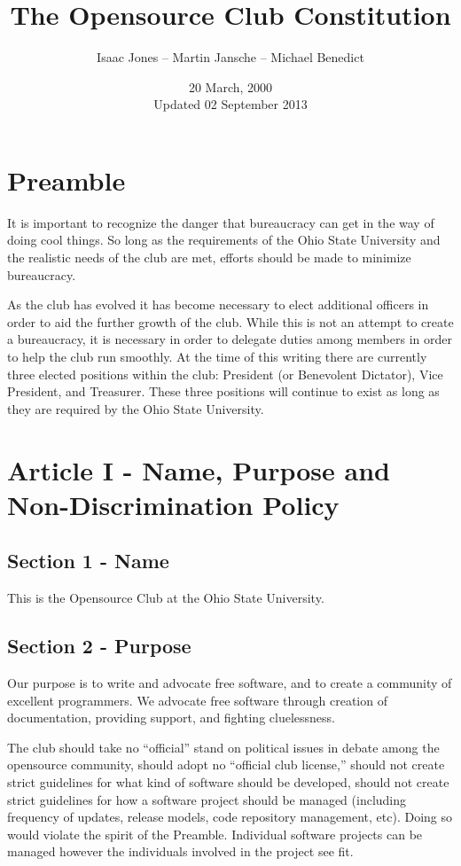 \documentclass{article}
\title{The Opensource Club Constitution}
\author{Isaac Jones -- Martin Jansche -- Michael Benedict}
\date{20 March, 2000\\ Updated 02 September 2013}
\begin{document}
	\maketitle

	\section{Preamble}

	It is important to recognize the danger that bureaucracy can get in the way of doing cool things.  So long as the requirements of the Ohio State University and the realistic needs of the club are met, efforts should be made to minimize bureaucracy.

	As the club has evolved it has become necessary to elect additional officers in order to aid the further growth of the club. While this is not an attempt to create a bureaucracy, it is necessary in order to delegate duties among members in order to help the club run smoothly. At the time of this writing there are currently three elected positions within the club: President (or Benevolent Dictator), Vice President, and Treasurer. These three positions will continue to exist as long as they are required by the Ohio State University.

	\section{Article I - Name, Purpose and Non-Discrimination Policy}

	\subsection{Section 1 - Name}

	This is the Opensource Club at the Ohio State University.

	\subsection{Section 2 - Purpose}

	Our purpose is to write and advocate free software, and to create a community of excellent programmers. We advocate free software through creation of documentation, providing support, and fighting cluelessness.

	The club should take no ``official'' stand on political issues in debate among the opensource community, should adopt no ``official club license,'' should not create strict guidelines for what kind of software should be developed, should not create strict guidelines for how a software project should be managed (including frequency of updates, release models, code repository management, etc). Doing so would violate the spirit of the Preamble. Individual software projects can be managed however the individuals involved in the project see fit.
\end{document}
